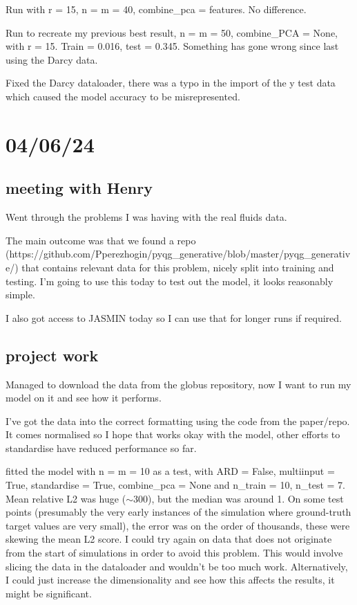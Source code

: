 \documentclass[11pt,a4paper]{article}
\begin{document}
Run with r = 15, n = m = 40, combine\_pca = features.
No difference.

Run to recreate my previous best result, n = m = 50, combine\_PCA = None, with r = 15.
Train = 0.016, test = 0.345.
Something has gone wrong since last using the Darcy data.

Fixed the Darcy dataloader, there was a typo in the import of the y test data which caused the model accuracy to be misrepresented.

\section{04/06/24}

\subsection{meeting with Henry}

Went through the problems I was having with the real fluids data.

The main outcome was that we found a repo (https://github.com/Pperezhogin/pyqg_generative/blob/master/pyqg_generative/) that contains relevant data for this problem, nicely split into training and testing.
I'm going to use this today to test out the model, it looks reasonably simple.

I also got access to JASMIN today so I can use that for longer runs if required.

\subsection{project work}

Managed to download the data from the globus repository, now I want to run my model on it and see how it performs.

I've got the data into the correct formatting using the code from the paper/repo.
It comes normalised so I hope that works okay with the model, other efforts to standardise have reduced performance so far.

fitted the model with n = m = 10 as a test, with ARD = False, multiinput = True, standardise = True, combine_pca = None and n_train = 10, n_test = 7.
Mean relative L2 was huge ($\sim$300), but the median was around 1.
On some test points (presumably the very early instances of the simulation where ground-truth target values are very small), the error was on the order of thousands, these were skewing the mean L2 score.
I could try again on data that does not originate from the start of simulations in order to avoid this problem.
This would involve slicing the data in the dataloader and wouldn't be too much work.
Alternatively, I could just increase the dimensionality and see how this affects the results, it might be significant.
\end{document}
